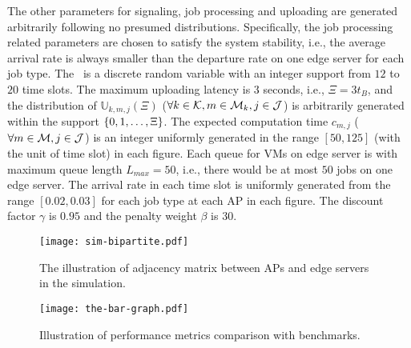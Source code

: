 {
    The other parameters for signaling, job processing and uploading are generated arbitrarily following no presumed distributions.
    Specifically, the job processing related parameters are chosen to satisfy the system stability, i.e., the average arrival rate is always smaller than the departure rate on one edge server for each job type.
}
The \brlatency~is a discrete random variable with an integer support from $12$ to $20$ time slots.
The maximum uploading latency is $3$ seconds, i.e., $\Xi = 3t_B$, and the distribution of $\mathbb{U}_{k,m,j}(\Xi)$ ($\forall k\in\mathcal{K}, m\in\mathcal{M}_{k}, j\in\mathcal{J}$) is arbitrarily generated within the support $\{0, 1, \dots, \Xi\}$.
The expected computation time $c_{m,j}$ ($\forall m\in\mathcal{M}, j\in\mathcal{J}$) is an integer uniformly generated in the range $[50,125]$ (with the unit of time slot) in each figure.
Each queue for VMs on edge server is with maximum queue length $L_{max}=50$, i.e., there would be at most $50$ jobs on one edge server.
The arrival rate in each time slot is uniformly generated from the range $[0.02, 0.03]$ for each job type at each AP in each figure.
The discount factor $\gamma$ is $0.95$ and the penalty weight $\beta$ is $30$.
\begin{figure}[ht]                                                      %
    \centering                                                          %
    \texttt{[image: sim-bipartite.pdf]}           %
    \caption{The illustration of adjacency matrix between APs and edge servers in the simulation.}
    \label{fig:bipartite}                                               %
\end{figure}                                                            %

\begin{figure}[ht]                                                      %
    \centering                                                          %
    \texttt{[image: the-bar-graph.pdf]}               %
    \caption{Illustration of performance metrics comparison with benchmarks.}
    \label{fig:bar_plot}                                                %
\end{figure}                                                            %

